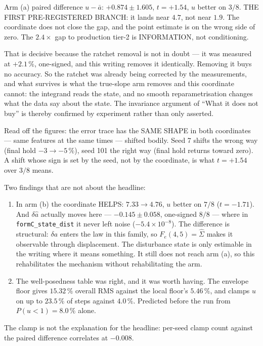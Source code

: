 \documentclass[11pt,a4paper,fontset=none]{ctexart}
\newcommand{\ba}{\bar{a}}
\begin{document}
Arm (a) paired difference $u-\ba$: $+0.874 \pm 1.605$, $t = +1.54$, $u$ better on
$3/8$. THE FIRST PRE-REGISTERED BRANCH: it lands near $4.7$, not near $1.9$. The
coordinate does not close the gap, and the point estimate is on the wrong side
of zero. The $2.4\times$ gap to production tier-2 is INFORMATION, not
conditioning.

That is decisive because the ratchet removal is not in doubt --- it was measured
at $+2.1\,\%$, one-signed, and this writing removes it identically. Removing it
buys no accuracy. So the ratchet was already being corrected by the
measurements, and what survives is what the true-slope arm removes and this
coordinate cannot: the integrand reads the state, and no smooth
reparametrisation changes what the data say about the state. The invariance
argument of ``What it does not buy'' is thereby confirmed by experiment rather
than only asserted.

Read off the figures: the error trace has the SAME SHAPE in both coordinates ---
same features at the same times --- shifted bodily. Seed 7 shifts the wrong way
(final hold $-3 \to -5\,\%$), seed 101 the right way (final hold returns toward
zero). A shift whose sign is set by the seed, not by the coordinate, is what
$t = +1.54$ over $3/8$ means.

Two findings that are not about the headline:

\begin{enumerate}
\item In arm (b) the coordinate HELPS: $7.33 \to 4.76$, $u$ better on $7/8$
($t = -1.71$). And $\delta\hat{a}$ actually moves here --- $-0.145 \pm 0.058$,
one-signed $8/8$ --- where in \texttt{formC\_state\_dist} it never left noise
($-5.4\times10^{-8}$). The difference is structural: $\delta a$ enters the law
in this family, so $F_e(4,5) = \hat\Sigma$ makes it observable through
displacement. The disturbance state is only estimable in the writing where it
means something. It still does not reach arm (a), so this rehabilitates the
mechanism without rehabilitating the arm.
\item The well-posedness table was right, and it was worth having. The envelope
floor gives $15.32\,\%$ overall RMS against the local floor's $5.46\,\%$, and
clamps $u$ on up to $23.5\,\%$ of steps against $4.0\,\%$. Predicted before the
run from $P(u<1) = 8.0\,\%$ alone.
\end{enumerate}

The clamp is not the explanation for the headline: per-seed clamp count against
the paired difference correlates at $-0.008$.
\end{document}
